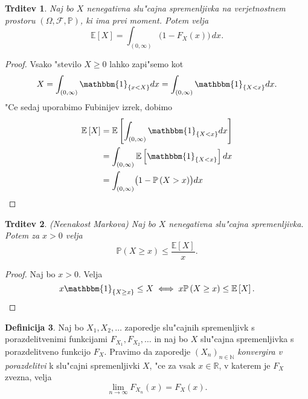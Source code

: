 \documentclass[12pt, a4paper, reqno]{amsart}
\theoremstyle{definition}
\newtheorem{definicija}{Definicija}[section]
\theoremstyle{plain}
\newtheorem{trditev}[definicija]{Trditev}
\newcommand{\R}{\mathbb{R}}
\newcommand{\N}{\mathbb{N}}
\newcommand{\E}{\mathbb{E}}
\newcommand{\Prob}{\mathbb{P}}
\newcommand{\1}{\mathds{1}}
\begin{document}
    \begin{trditev}
        Naj bo $X$ nenegativna slu"cajna spremenljivka na verjetnostnem prostoru $(\Omega, \mathcal{F}, \Prob)$, 
        ki ima prvi moment. Potem velja 
        \begin{equation*}
            \E\left[X\right] = \int_{(0, \infty)}\bigl(1 - F_X(x)\bigr)\,dx.
        \end{equation*}
        \label{trd:PricakovanaVrednostZPrezivetveno}
    \end{trditev}

    \begin{proof}
        Vsako "stevilo $X\geq 0$ lahko zapi"semo kot 
        \begin{equation*}
            X = \int_{(0, \infty)}\mathbbm{1}_{\{x < X\}}dx = \int_{(0, \infty)}\mathbbm{1}_{\{X < x\}}dx.
        \end{equation*}
        "Ce sedaj uporabimo Fubinijev izrek, dobimo
        \begin{align*}
            \E\left[X\right] &= \E\left[\int_{(0, \infty)}\mathbbm{1}_{\{X < x\}}dx\right] \\
                             &= \int_{(0, \infty)}\E\left[\mathbbm{1}_{\{X < x\}}\right]dx \\
                             &= \int_{(0, \infty)}\bigl(1 - \Prob\left(X > x\right)\bigr)dx \\
        \end{align*}
    \end{proof}

    \begin{trditev}(Neenakost Markova)
        \label{trd:neenakostMarkova}
        Naj bo $X$ nenegativna slu"cajna spremenljivka.
        Potem za  $x>0$ velja
        \begin{equation*}
            \Prob\left(X \geq x\right) \leq \frac{\E\left[X\right]}{x}.
        \end{equation*}
    \end{trditev}

    \begin{proof}
        Naj bo $x > 0$. Velja
        \begin{equation*}
            x\mathbbm{1}_{\{X \geq x\}} \leq X \iff x\Prob\left(X \geq x\right) \leq \E\left[X\right].
        \end{equation*}
    \end{proof}

    \begin{definicija}
        Naj bo $X_1, X_2, \dots$ zaporedje slu"cajnih spremenljivk s porazdelitvenimi funkcijami
        $F_{X_1}, F_{X_2}, \dots$ in naj bo $X$ slu"cajna spremenljivka s porazdelitveno funkcijo $F_X$.
        Pravimo da zaporedje $(X_n)_{n\in\N}$ \textit{konvergira v porazdelitvi} k slu"cajni spremenljivki $X$,
        "ce za vsak $x\in\R$, v katerem je $F_X$ zvezna, velja
        \begin{equation*}
            \lim_{n\to\infty}F_{X_n}(x) = F_X(x).
        \end{equation*}
        \label{def:KonvergencaVPorazdelitvi}
    \end{definicija}
\end{document}
